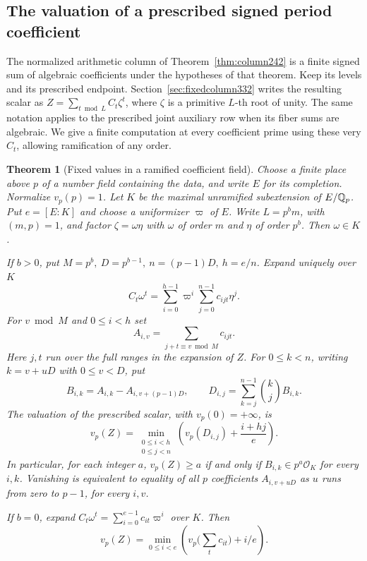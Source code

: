 \documentclass[a4paper,11pt]{article}
\newtheorem{theorem}[proposition]{Theorem}
\theoremstyle{definition}
\theoremstyle{remark}
\numberwithin{equation}{section}
\begin{document}
\subsection{The valuation of a prescribed signed period coefficient}\label{sec:fixedadic332}
The normalized arithmetic column of Theorem~\ref{thm:column242}
is a finite signed sum of algebraic coefficients under the hypotheses
of that theorem. Keep its levels and its prescribed endpoint.
Section~\ref{sec:fixedcolumn332} writes the resulting scalar as
\(Z=\sum_{t\bmod L} C_t\zeta^t\), where \(\zeta\) is a primitive
\(L\)-th root of unity. The same notation applies to the prescribed
joint auxiliary row when its fiber sums are algebraic.
We give a finite computation at every coefficient prime using these
very \(C_t\), allowing ramification of any order.

\begin{theorem}[Fixed values in a ramified coefficient field]\leavevmode
\label{thm:fixedadic332}
Choose a finite place above \(p\) of a number field containing the
data, and write \(E\) for its completion. Normalize \(v_p(p)=1\).
Let \(K\) be the maximal unramified subextension of \(E/\mathbb Q_p\).
Put \(e=[E:K]\) and choose a uniformizer \(\varpi\) of \(E\).
Write \(L=p^b m\), with \((m,p)=1\), and factor
\(\zeta=\omega\eta\) with \(\omega\) of order \(m\) and \(\eta\)
of order \(p^b\). Then \(\omega\in K\).

If \(b>0\), put \(M=p^b,\ D=p^{b-1},\ n=(p-1)D,\ h=e/n\).
Expand uniquely over \(K\)
\[
 C_t\omega^t=\sum_{i=0}^{h-1}\varpi^i
                  \sum_{j=0}^{n-1} c_{ijt}\eta^j .
\]
For \(v\bmod M\) and \(0\le i<h\) set
\[
 A_{i,v}=\sum_{j+t\equiv v\bmod M} c_{ijt}.
\]
Here \(j,t\) run over the full ranges in the expansion of \(Z\).
For \(0\le k<n\), writing \(k=v+uD\) with \(0\le v<D\),
put
\[
 B_{i,k}=A_{i,k}-A_{i,v+(p-1)D},\qquad
 D_{i,j}=\sum_{k=j}^{n-1}\binom{k}{j} B_{i,k}.
\]
The valuation of the prescribed scalar, with \(v_p(0)=+\infty\), is
\begin{equation}\label{eq:fixedadic332}
 v_p(Z)=\min_{\substack{0\le i<h\\0\le j<n}}
              \left(v_p(D_{i,j})+\frac{i+hj}{e}\right).
\end{equation}
In particular, for each integer \(a\), \(v_p(Z)\ge a\) if and only if
\(B_{i,k}\in p^a\mathcal O_K\) for every \(i,k\). Vanishing is equivalent
to equality of all \(p\) coefficients \(A_{i,v+uD}\) as \(u\)
runs from zero to \(p-1\), for every \(i,v\).

If \(b=0\), expand \(C_t\omega^t=\sum_{i=0}^{e-1}c_{it}\varpi^i\)
over \(K\). Then
\[
 v_p(Z)=\min_{0\le i<e}\left(v_p\Big(\sum_t c_{it}\Big)+i/e\right).
\]
\end{theorem}
\end{document}
